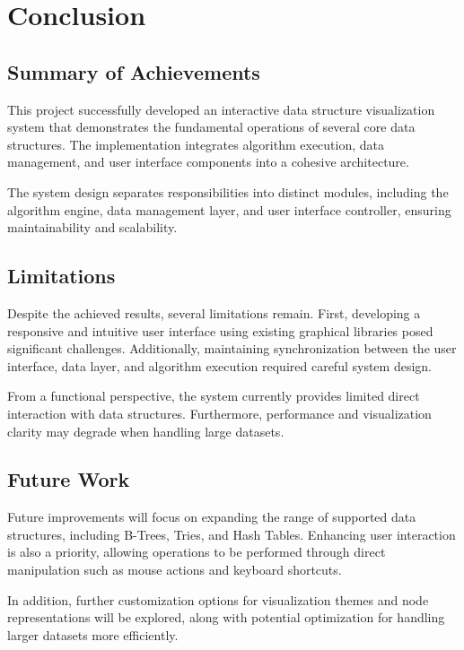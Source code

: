 \section{Conclusion}


\subsection{Summary of Achievements}

This project successfully developed an interactive data structure visualization system that demonstrates the fundamental operations of several core data structures. The implementation integrates algorithm execution, data management, and user interface components into a cohesive architecture.

The system design separates responsibilities into distinct modules, including the algorithm engine, data management layer, and user interface controller, ensuring maintainability and scalability.

\subsection{Limitations}

Despite the achieved results, several limitations remain. First, developing a responsive and intuitive user interface using existing graphical libraries posed significant challenges. Additionally, maintaining synchronization between the user interface, data layer, and algorithm execution required careful system design.

From a functional perspective, the system currently provides limited direct interaction with data structures. Furthermore, performance and visualization clarity may degrade when handling large datasets.

\subsection{Future Work}

Future improvements will focus on expanding the range of supported data structures, including B-Trees, Tries, and Hash Tables. Enhancing user interaction is also a priority, allowing operations to be performed through direct manipulation such as mouse actions and keyboard shortcuts.

In addition, further customization options for visualization themes and node representations will be explored, along with potential optimization for handling larger datasets more efficiently.
